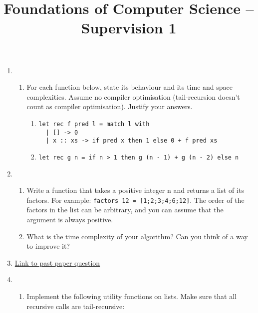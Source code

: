 \documentclass[11pt,a4paper]{article}
\title{Foundations of Computer Science -- Supervision 1}
\author{}
\date{}
\begin{document}
\maketitle



\begin{enumerate}


\item
\begin{enumerate}
    \item For each function below, state its behaviour and its time and space complexities. 
    Assume no compiler optimisation (tail-recursion doesn’t count as compiler optimisation). Justify your answers.
    \begin{enumerate}
        \item \begin{verbatim}
let rec f pred l = match l with
  | [] -> 0
  | x :: xs -> if pred x then 1 else 0 + f pred xs
\end{verbatim}

        \item \begin{verbatim}
let rec g n = if n > 1 then g (n - 1) + g (n - 2) else n
\end{verbatim}
    \end{enumerate}
\end{enumerate}

\item 
\begin{enumerate}
    \item Write a function that takes a positive integer n and returns a list of its factors.  
    For example: \verb|factors 12 = [1;2;3;4;6;12]|.  
    The order of the factors in the list can be arbitrary, and you can assume that the argument is always positive.

    \item What is the time complexity of your algorithm? Can you think of a way to improve it?
\end{enumerate}

\item 
\href{https://www.cl.cam.ac.uk/teaching/exams/pastpapers/y1995p1q3.pdf}{Link to past paper question}

\item 
\begin{enumerate}
    \item Implement the following utility functions on lists.  
    Make sure that all recursive calls are tail-recursive:


\end{enumerate}
\end{enumerate}
\end{document}
